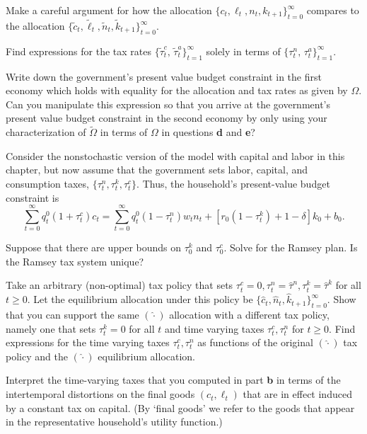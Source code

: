 \medskip
{} Make a careful argument for how the allocation
$\{c_t, \ell_t, n_t, k_{t+1}\}_{t=0}^\infty$ compares
to the allocation $\{\tilde c_t, \tilde \ell_t, \tilde n_t,
\tilde k_{t+1}\}_{t=0}^\infty$.

\medskip
{} Find expressions for the tax rates
$\{\tilde \tau^c_t, \,\tilde \tau^a_t\}_{t=1}^\infty$
solely in terms of
$\{\tau^n_t, \,\tau^a_t\}_{t=1}^\infty$.


\medskip
{} Write down the government's present
value budget constraint in the first economy which holds with
equality for the allocation and tax rates as given by
$\Omega$. Can you manipulate this expression so that
you arrive at the government's present value budget constraint in
the second economy by only using
your characterization of $\tilde \Omega$
in terms of $\Omega$ in questions {\bf d} and {\bf e}?

\vfil\eject

\medskip
{}

\medskip
\noindent
Consider the nonstochastic version of the model with capital and labor in this
chapter, but now assume that the
government sets labor, capital, and consumption taxes, $\{\tau^n_t, \tau^k_t, \tau^c_t\}$.
Thus, the household's present-value budget constraint is
$$
\sum_{t=0}^\infty q^0_t (1+\tau^c_t) c_t =
\sum_{t=0}^\infty q^0_t (1-\tau^n_t) w_t n_t
   + \left[r_{0}(1-\tau^k_t) + 1-\delta \right] k_0 + b_0.
$$

\medskip
{} Suppose that there are upper bounds on $\tau^k_0$ and $\tau^c_0$. Solve for the Ramsey plan.  Is the Ramsey tax system
unique?

\medskip
{} Take an arbitrary (non-optimal) tax policy that sets $\tau^c_t = 0, \tau^n_t = \hat \tau^n, \tau^k_t = \hat \tau^k$
for all $t \geq 0$.  Let the equilibrium allocation under this policy be $\{\hat c_t, \hat n_t, \hat k_{t+1}\}_{t=0}^\infty$.
Show that you can support the same $(\hat \cdot)$ allocation with a  different tax policy, namely one that sets  $\tau^k_t =0 $ for all $t$ and time varying
taxes $\tau^c_t, \tau^n_t$ for $t \geq 0$.    Find expressions for the time varying taxes $\tau^c_t, \tau^n_t$ as functions of the original $(\hat \cdot)$
tax policy and the $(\hat \cdot)$  equilibrium allocation.

\medskip
{} Interpret the time-varying taxes that you computed in part {\bf b} in terms of the intertemporal distortions
on the final goods $(c_t, \ell_t)$  that are in effect  induced
by a constant tax on capital. (By `final goods' we refer to the goods that appear in the representative household's utility function.)


